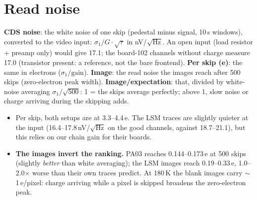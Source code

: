 \documentclass[10pt]{article}
\newcommand{\what}[1]{\par\colorbox{boxbg}{\parbox{\dimexpr\linewidth-2\fboxsep}{\small #1}}\par}
\begin{document}
\section{Read noise}
\what{\textbf{CDS noise}: the white noise of one skip (pedestal minus signal, 10\,\textmu s windows), converted to the
video input: $\sigma_1/G\cdot\sqrt{\tau}$ in nV/$\sqrt{\text{Hz}}$. An open input (load resistor + preamp only) would give 17.1; the board-102 channels without charge measure 17.0
(transistor present: a reference, not the bare frontend). \textbf{Per skip (e)}: the same in electrons ($\sigma_1/\text{gain}$). \textbf{Image}: the read noise the
images reach after 500 skips (zero-electron peak width). \textbf{Image/expectation}: that, divided by white-noise averaging
$\sigma_1/\sqrt{500}$: 1 = the skips average perfectly; above 1, slow noise or charge arriving during the skipping adds.}

\begin{itemize}[nosep]
\item Per skip, both setups are at 3.3--4.4\,e. The LSM traces are slightly quieter at the input (16.4--17.8\,nV/$\sqrt{\text{Hz}}$
  on the good channels, against 18.7--21.1), but this relies on our chain gain for their boards.
\item \textbf{The images invert the ranking.} PA03 reaches 0.144--0.173\,e at 500 skips (slightly \emph{better} than white
  averaging); the LSM images reach 0.19--0.33\,e, 1.0--2.0$\times$ worse than their own traces predict. At 180\,K the blank
  images carry $\sim$1\,e/pixel: charge arriving while a pixel is skipped broadens the zero-electron peak.
\end{itemize}

\clearpage
\end{document}
